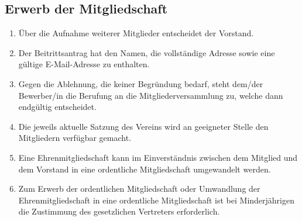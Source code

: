 \documentclass[12pt,a4paper,draft]{article}
\begin{document}
\subsection{Erwerb der Mitgliedschaft} %
\begin{enumerate}
\item Über die Aufnahme weiterer Mitglieder entscheidet der Vorstand.

\item Der Beitrittsantrag hat den Namen, die vollständige Adresse sowie eine 
gültige E-Mail-Adresse zu enthalten.

\item Gegen die Ablehnung, die keiner Begründung bedarf, steht dem/der 
Bewerber/in die Berufung an die Mitgliederversammlung zu, welche dann 
endgültig entscheidet.

\item Die jeweils 
aktuelle Satzung des Vereins wird an geeigneter Stelle den Mitgliedern 
verfügbar gemacht.

\item Eine Ehrenmitgliedschaft kann im Einverständnis zwischen dem Mitglied 
und dem Vorstand in eine ordentliche Mitgliedschaft umgewandelt werden.

\item Zum Erwerb der ordentlichen Mitgliedschaft oder Umwandlung der 
Ehrenmitgliedschaft in eine ordentliche Mitgliedschaft ist bei 
Minderjährigen die Zustimmung des gesetzlichen Vertreters erforderlich.
\end{enumerate}
\end{document}
